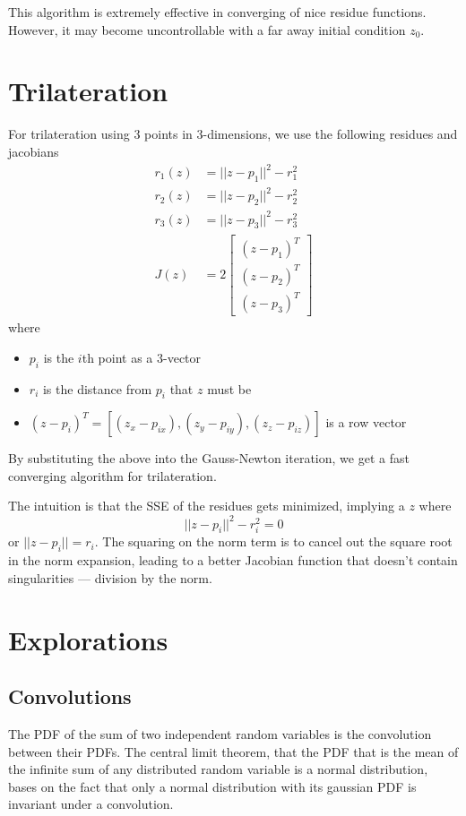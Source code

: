 \documentclass[11pt]{article}
\begin{document}
This algorithm is extremely effective in converging of nice residue functions. However, it may become uncontrollable with a far away initial condition $z_0$.

\newpage
\section{Trilateration}
For trilateration using 3 points in 3-dimensions, we use the following residues and jacobians
\begin{align*}
	r_1(z) &= ||z - p_1||^2 - r_1^2\\
	r_2(z) &= ||z - p_2||^2 - r_2^2\\
	r_3(z) &= ||z - p_3||^2 - r_3^2\\
	J(z) &= 2\begin{bmatrix}
		(z - p_1)^T\\
		(z - p_2)^T\\
		(z - p_3)^T
	\end{bmatrix}
\end{align*}
where
\begin{itemize}
	\item $p_i$ is the $i$th point as a 3-vector
	\item $r_i$ is the distance from $p_i$ that $z$ must be
	\item $(z - p_i)^T = [(z_x - p_{ix}), (z_y - p_{iy}), (z_z - p_{iz})]$ is a row vector
\end{itemize}

By substituting the above into the Gauss-Newton iteration, we get a fast converging algorithm for trilateration.

The intuition is that the SSE of the residues gets minimized, implying a $z$ where
\[
	||z-p_i||^2 - r_i^2 = 0
\] or $||z-p_i|| = r_i$. The squaring on the norm term is to cancel out the square root in the norm expansion, leading to a better Jacobian function that doesn't contain singularities --- division by the norm.

\newpage
\section{Explorations}

\subsection{Convolutions}
The PDF of the sum of two independent random variables is the convolution between their PDFs. The central limit theorem, that the PDF that is the mean of the infinite sum of any distributed random variable is a normal distribution, bases on the fact that only a normal distribution with its gaussian PDF is invariant under a convolution.
\end{document}
